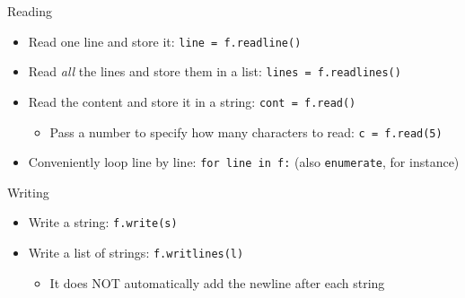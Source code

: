 \documentclass[a4paper,12pt,%
              final%
              ]{article}
\begin{document}
Reading
\begin{itemize}
  \item Read one line and store it: \verb|line = f.readline()|
  \item Read \emph{all} the lines and store them in a list: \verb|lines = f.readlines()|
  \item Read the content and store it in a string: \verb|cont = f.read()|
    \begin{itemize}
      \item Pass a number to specify how many characters to read: \verb|c = f.read(5)|
    \end{itemize}
  \item Conveniently loop line by line: \verb|for line in f:| (also \verb|enumerate|, for instance)
\end{itemize}

Writing
\begin{itemize}
  \item Write a string: \verb|f.write(s)|
  \item Write a list of strings: \verb|f.writlines(l)|
    \begin{itemize}
      \item It does NOT automatically add the newline after each string
    \end{itemize}
\end{itemize}
\end{document}

